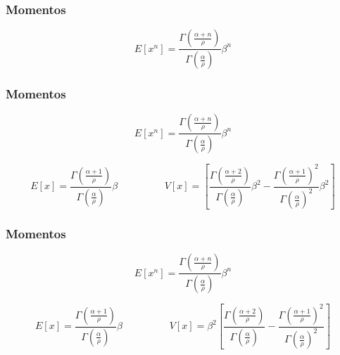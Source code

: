 \begin{frame}
    \frametitle{Momentos}
    \begin{equation*}
        E[x^n] = \frac{\Gamma \left (\frac{\alpha+n}{\rho} \right)}{{\Gamma \left ( \frac{\alpha}{\rho} \right)}} \beta^n
    \end{equation*}
\end{frame}

\begin{frame}
    \frametitle{Momentos}
    \begin{equation*}
        E[x^n] = \frac{\Gamma \left (\frac{\alpha+n}{\rho} \right)}{{\Gamma \left ( \frac{\alpha}{\rho} \right)}} \beta^n
    \end{equation*}

    \begin{equation*}
        E[x] = \frac{\Gamma \left (\frac{\alpha+1}{\rho} \right)}{{\Gamma \left ( \frac{\alpha}{\rho} \right)}} \beta
        \hspace{2cm}
        V[x] = \left[ \frac{\Gamma \left (\frac{\alpha+2}{\rho} \right)}{{\Gamma \left ( \frac{\alpha}{\rho} \right)}} \beta^2 -
                      \frac{\Gamma \left (\frac{\alpha+1}{\rho} \right)^2}{{\Gamma \left ( \frac{\alpha}{\rho} \right)}^2} \beta^2 \right]
    \end{equation*}
\end{frame}

\begin{frame}
    \frametitle{Momentos}
    \begin{equation*}
        E[x^n] = \frac{\Gamma \left (\frac{\alpha+n}{\rho} \right)}{{\Gamma \left ( \frac{\alpha}{\rho} \right)}} \beta^n
    \end{equation*}

    \begin{equation*}
        E[x] = \frac{\Gamma \left (\frac{\alpha+1}{\rho} \right)}{{\Gamma \left ( \frac{\alpha}{\rho} \right)}} \beta
        \hspace{2cm}
        V[x] = \beta^2 \left[ \frac{\Gamma \left (\frac{\alpha+2}{\rho} \right)}{{\Gamma \left ( \frac{\alpha}{\rho} \right)}} -
                               \frac{\Gamma \left (\frac{\alpha+1}{\rho} \right)^2}{{\Gamma \left ( \frac{\alpha}{\rho} \right)}^2} \right]
    \end{equation*}
\end{frame}

